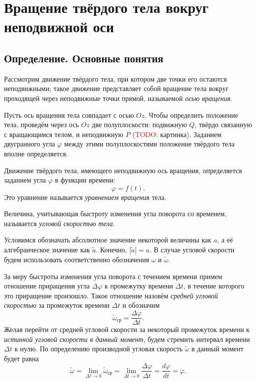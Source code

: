 \documentclass{article}
\theoremstyle{definition}
\theoremstyle{plain}
\theoremstyle{remark}
\numberwithin{equation}{section}
\newcommand{\abs}[1]{\left|#1\right|}
\newcommand{\der}[2][]{\frac{d #1}{d #2}}
\newcommand{\deltader}[2]{\frac{\Delta #1}{\Delta #2}}
\newcommand{\dt}[1][]{\der[#1]{t}}
\begin{document}
\pagebreak


\section{Вращение твёрдого тела вокруг неподвижной оси}

\subsection{Определение. Основные понятия}

Рассмотрим движение твёрдого тела, при котором две точки его остаются
неподвижными; такое движение представляет собой вращение тела вокруг проходящей
через неподвижные точки прямой, называемой \textit{осью вращения}.

Пусть ось вращения тела совпадает с осью $Oz$. Чтобы определить положение тела,
проведём через ось $Oz$ две полуплоскости: подвижную $Q$, твёрдо связанную с
вращающимся телом, и неподвижную $P$ (\textcolor{red}{TODO:} картинка). Заданием
двугранного угла $\varphi$ между этими полуплоскостями положение твёрдого тела
вполне определяется.

Движение твёрдого тела, имеющего неподвижную ось вращения, определяется заданием
угла $\varphi$ в функции времени:
\begin{equation}
  \varphi = f(t).
\end{equation}
Это уравнение называется \textit{уравнением вращения} тела.

Величина, учитывающая быстроту изменения угла поворота со временем, называется
\textit{угловой скоростью тела}.

Условимся обозначать абсолютное значение некоторой величины как $a$, а её
алгебраическое значение как $\tilde{a}$. Конечно, $\abs{\tilde{a}} = a$. В
случае угловой скорости будем использовать соответственно обозначения $\omega$
и $\tilde{\omega}$.

За меру быстроты изменения угла поворота с течением времени примем отношение
приращения угла $\Delta \varphi$ к промежутку времени $\Delta t$, в течение
которого это приращение произошло. Такое отношение назовём \textit{средней
угловой скоростью} за промежуток времени $\Delta t$ и обозначим
\begin{equation*}
  \tilde{\omega}_{\text{ср}} = \deltader{\varphi}{t}.
\end{equation*}
Желая перейти от средней угловой скорости за некоторый промежуток времени к
\textit{истинной угловой скорости в данный момент}, будем стремить интервал
времени $\Delta t$ к нулю. По определению производной угловая скорость
$\tilde{\omega}$ в данный момент будет равна
\begin{equation}
  \label{eq:angular_velocity}
  \tilde{\omega} = \lim_{\Delta t \to 0} \tilde{\omega}_{\text{ср}} =
    \lim_{\Delta t \to 0} \deltader{\varphi}{t} = \dt[\varphi] = \dot{\varphi}.
\end{equation}
\end{document}
